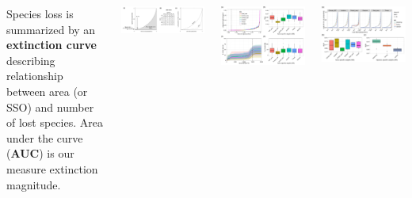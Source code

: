 \documentclass[25pt, a0paper, portrait, margin=0mm, innermargin=15mm,
     blockverticalspace=15mm, colspace=15mm, subcolspace=8mm]{tikzposter}
\begin{document}
\begin{columns}
{	Species loss is summarized by an \textbf{extinction curve} 
	describing relationship between area (or SSO) and number of lost 
	species. Area under the curve (\textbf{AUC}) is our measure 
	extinction magnitude.

	\includegraphics[scale=0.9]{Figure_2.pdf}
}




{
  \begin{center}
		{\includegraphics[scale=1.4]{Figure_3.pdf}}
  \end{center}
}

{
\begin{center}
	\includegraphics[scale=1.5]{Figure_5.pdf}
\end{center}

}
\end{columns}
\end{document}
